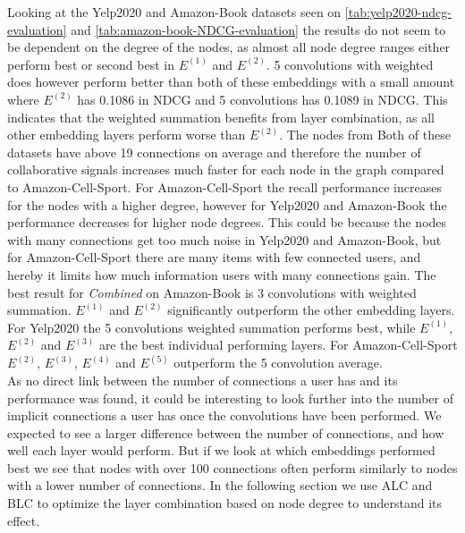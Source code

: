 Looking at the Yelp2020 and Amazon-Book datasets seen on \autoref{tab:yelp2020-ndcg-evaluation} and \autoref{tab:amazon-book-NDCG-evaluation} the results do not seem to be dependent on the degree of the nodes, as almost all node degree ranges either perform best or second best in $E^{(1)}$ and $E^{(2)}$.
5 convolutions with weighted does however perform better than both of these embeddings with a small amount where $E^{(2)}$ has 0.1086 in NDCG and 5 convolutions has 0.1089 in NDCG.
This indicates that the weighted summation benefits from layer combination, as all other embedding layers perform worse than $E^{(2)}$.
The nodes from Both of these datasets have above 19 connections on average and therefore the number of collaborative signals increases much faster for each node in the graph compared to Amazon-Cell-Sport.
For Amazon-Cell-Sport the recall performance increases for the nodes with a higher degree, however for Yelp2020 and Amazon-Book the performance decreases for higher node degrees.
This could be because the nodes with many connections get too much noise in Yelp2020 and Amazon-Book, but for Amazon-Cell-Sport there are many items with few connected users, and hereby it limits how much information users with many connections gain.
The best result for \textit{Combined} on Amazon-Book is 3 convolutions with weighted summation.
$E^{(1)}$ and $E^{(2)}$ significantly outperform the other embedding layers.
For Yelp2020 the 5 convolutions weighted summation performs best, while $E^{(1)}$, $E^{(2)}$ and $E^{(3)}$ are the best individual performing layers.
For Amazon-Cell-Sport $E^{(2)}$, $E^{(3)}$, $E^{(4)}$ and $E^{(5)}$ outperform the 5 convolution average.
\\
As no direct link between the number of connections a user has and its performance was found, it could be interesting to look further into the number of implicit connections a user has once the convolutions have been performed.
We expected to see a larger difference between the number of connections, and how well each layer would perform.
But if we look at which embeddings performed best we see that nodes with over 100 connections often perform similarly to nodes with a lower number of connections.
In the following section we use ALC and BLC to optimize the layer combination based on node degree to understand its effect.

